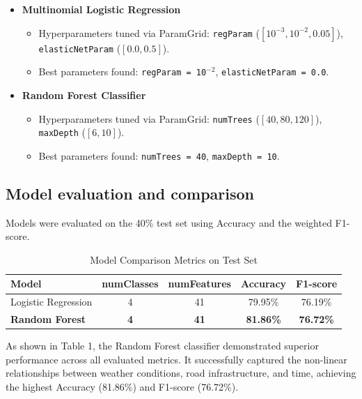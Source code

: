 \documentclass[11pt,a4paper]{article}
\begin{document}
\begin{itemize}
    \item \textbf{Multinomial Logistic Regression}
    \begin{itemize}
        \item Hyperparameters tuned via ParamGrid: \texttt{regParam} ($[10^{-3}, 10^{-2}, 0.05]$), \texttt{elasticNetParam} ($[0.0, 0.5]$).
        \item Best parameters found: \texttt{regParam = 10$^{-2}$}, \texttt{elasticNetParam = 0.0}.
    \end{itemize}
    \item \textbf{Random Forest Classifier}
    \begin{itemize}
        \item Hyperparameters tuned via ParamGrid: \texttt{numTrees} ($[40, 80, 120]$), \texttt{maxDepth} ($[6, 10]$).
        \item Best parameters found: \texttt{numTrees = 40}, \texttt{maxDepth = 10}.
    \end{itemize}
\end{itemize}

\subsection*{Model evaluation and comparison}
Models were evaluated on the 40\% test set using Accuracy and the weighted F1-score. 

\begin{table}[H]
    \centering
    \renewcommand{\arraystretch}{1.3}
    \begin{tabular}{|l|c|c|c|c|}
        \hline
        \textbf{Model} & \textbf{numClasses} & \textbf{numFeatures} & \textbf{Accuracy} & \textbf{F1-score} \\
        \hline
        Logistic Regression & 4 & 41 & 79.95\% & 76.19\% \\
        \hline
        \textbf{Random Forest} & \textbf{4} & \textbf{41} & \textbf{81.86\%} & \textbf{76.72\%} \\
        \hline
    \end{tabular}
    \caption{Model Comparison Metrics on Test Set}
\end{table}

As shown in Table 1, the Random Forest classifier demonstrated superior performance across all evaluated metrics. It successfully captured the non-linear relationships between weather conditions, road infrastructure, and time, achieving the highest Accuracy (81.86\%) and F1-score (76.72\%).
\end{document}
